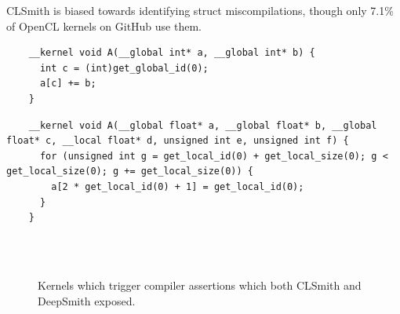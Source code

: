 CLSmith is biased towards identifying struct miscompilations, though only 7.1\% of OpenCL kernels on GitHub use them.


\newsavebox{\IntelPtrAssertion}
\begin{lrbox}{\IntelPtrAssertion}
  \hspace{1.5em}
  \begin{lstlisting}
    __kernel void A(__global int* a, __global int* b) {
      int c = (int)get_global_id(0);
      a[c] += b;
    }
  \end{lstlisting}
\end{lrbox}

\newsavebox{\IntelScalarAssertion}
\begin{lrbox}{\IntelScalarAssertion}
  \hspace{1.5em}
  \begin{lstlisting}
    __kernel void A(__global float* a, __global float* b, __global float* c, __local float* d, unsigned int e, unsigned int f) {
      for (unsigned int g = get_local_id(0) + get_local_size(0); g < get_local_size(0); g += get_local_size(0)) {
        a[2 * get_local_id(0) + 1] = get_local_id(0);
      }
    }
  \end{lstlisting}
\end{lrbox}

\begin{figure}
  \centering %
  \\%
  \\%
  \caption{Kernels which trigger compiler assertions which both CLSmith and DeepSmith exposed.}%
  \label{lst:clsmith-compiler-assertions}%
\end{figure}

